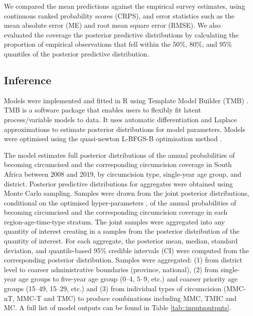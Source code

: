 \documentclass{article}
\begin{document}
\begin{appendix}
We compared the mean predictions against the empirical survey estimates, using continuous ranked probability scores (CRPS), and error statistics such as the mean absolute error (ME) and root mean square error (RMSE). We also evaluated the coverage the posterior predictive distributions by calculating the proportion of empirical observations that fell within the 50\%, 80\%, and 95\% quantiles of the posterior predictive distribution. 


\subsection{Inference}


\noindent Models were implemented and fitted in R \cite{rcore} using Template Model Builder (TMB) \cite{kristensen2016tmb}. TMB is a software package that enables users to flexibly fit latent process/variable models to data. It uses automatic differentiation and Laplace approximations to estimate posterior distributions for model parameters. Models were optimised using the quasi-newton L-BFGS-B optimisation method \cite{byrd1995limited}.

\noindent The model estimates full posterior distributions of the annual probabilities of becoming circumcised and the corresponding circumcision coverage in South Africa between 2008 and 2019, by circumcision type, single-year age group, and district. Posterior predictive distributions for aggregates were obtained using Monte Carlo sampling. Samples were drawn from the joint posterior distributions, conditional on the optimised hyper-parameters \cite{eaton2021naomi}, of the annual probabilities of becoming circumcised and the corresponding circumcision coverage in each region-age-time-type stratum. The joint samples were aggregated into any quantity of interest creating in a samples from the posterior distribution of the quantity of interest. For each aggregate, the posterior mean, median, standard deviation, and quantile-based 95\% credible intervals (CI) were computed from the corresponding posterior distribution. Samples were aggregated: (1) from district level to coarser administrative boundaries (province, national), (2) from single-year age groups to five-year age group (0--4, 5--9, etc.) and coarser priority age groups (15--49, 15--29, etc.) and (3) from individual types of circumcision (MMC-nT, MMC-T and TMC) to produce combinations including MMC, TMIC and MC. A full list of model outputs can be found in Table \ref{tab::inputsoutputs}.



\end{appendix}
\end{document}

